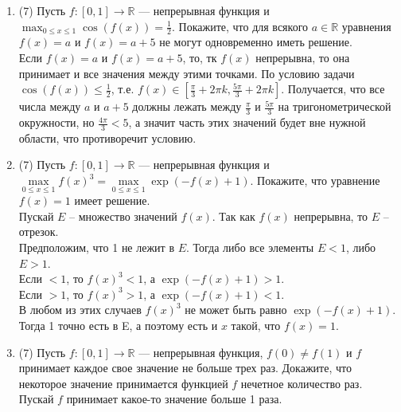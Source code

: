 \documentclass[a4paper]{article}
\begin{document}
\begin{enumerate}
    \item (7) Пусть $f:[0,1]\to \mathbb R$ --- непрерывная функция и $\max_{0\leq x\leq 1}\cos (f(x))=\frac{1}{2}$. Покажите, что для всякого $a\in \mathbb R$ уравнения $f(x) = a$ и $f(x) = a + 5$ не могут одновременно иметь решение.\\
    Если $f(x) = a$ и $f(x) = a + 5$, то, тк $f(x)$ непрерывна, то она принимает и все значения между этими точками. По условию задачи $\cos(f(x)) \le \frac{1}{2}$, т.е. $f(x) \in [\frac{\pi}{3} + 2\pi k, \frac{5\pi}{3} + 2\pi k]$. 
    Получается, что все числа между $a$ и $a + 5$ должны лежать между $\frac{\pi}{3}$ и $\frac{5\pi}{3}$ на тригонометрической окружности, но $\frac{4\pi}{3} < 5$, а значит часть этих значений будет вне нужной области, что противоречит условию.

\item (7) Пусть $f:[0,1]\to \mathbb R$ --- непрерывная функция и $\max\limits_{0\leq x\leq 1}f(x)^3 = \max\limits_{0\leq x\leq 1}\exp(-f(x) + 1)$. Покажите, что уравнение $f(x) = 1$ имеет решение.\\
Пускай $E$ -- множество значений $f(x)$. Так как $f(x)$ непрерывна, то $E$ -- отрезок.\\
Предположим, что 1 не лежит в $E$. Тогда либо все элементы $E < 1$, либо $E > 1$.\\
Если $< 1$, то $f(x)^3 < 1$, а $\exp(-f(x) + 1) > 1$.\\
Если $> 1$, то $f(x)^3 > 1$, а $\exp(-f(x) + 1) < 1$.\\
В любом из этих случаев $f(x)^3$ не может быть равно $\exp(-f(x) + 1)$. Тогда 1 точно есть в E, а поэтому есть и $x$ такой, что $f(x) = 1$.

\item (7) Пусть  $f:[0,1]\to \mathbb R$ --- непрерывная функция, $f(0)\neq f(1)$ и $f$ принимает каждое свое значение не больше трех раз. Докажите, что некоторое значение принимается функцией $f$ нечетное количество раз.\\
Пускай $f$ принимает какое-то значение больше 1 раза.
    
    
\end{enumerate}
\end{document}
